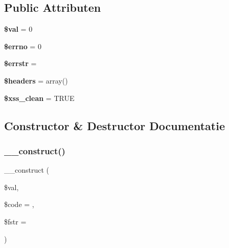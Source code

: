 \subsection*{Public Attributen}
\begin{DoxyCompactItemize}
\item 
\mbox{\label{class_x_m_l___r_p_c___response_aac81a74a7b30767af29bfd9a695636df}} 
{\bfseries \$val} = 0
\item 
\mbox{\label{class_x_m_l___r_p_c___response_a2be10a914e39a6b1f855ddf3b9a21367}} 
{\bfseries \$errno} = 0
\item 
\mbox{\label{class_x_m_l___r_p_c___response_a126a4369646afcf007816bfa8c208d11}} 
{\bfseries \$errstr} = \textquotesingle{}\textquotesingle{}
\item 
\mbox{\label{class_x_m_l___r_p_c___response_a52500036ee807241b8b4b7e2367c49ef}} 
{\bfseries \$headers} = array()
\item 
\mbox{\label{class_x_m_l___r_p_c___response_a0f2ee8861c0b3164a5c6e126dd98c0cc}} 
{\bfseries \$xss\+\_\+clean} = T\+R\+UE
\end{DoxyCompactItemize}


\subsection{Constructor \& Destructor Documentatie}
\mbox{\label{class_x_m_l___r_p_c___response_a62cc1aaff0155564cfc1c280707a8f86}} 
\subsubsection{\texorpdfstring{\_\_construct()}{\_\_construct()}}
{\footnotesize\ttfamily \+\_\+\+\_\+construct (\begin{DoxyParamCaption}\item[{}]{\$val,  }\item[{}]{\$code = {},  }\item[{}]{\$fstr = {\ttfamily \textquotesingle{}\textquotesingle{}} }\end{DoxyParamCaption})}

